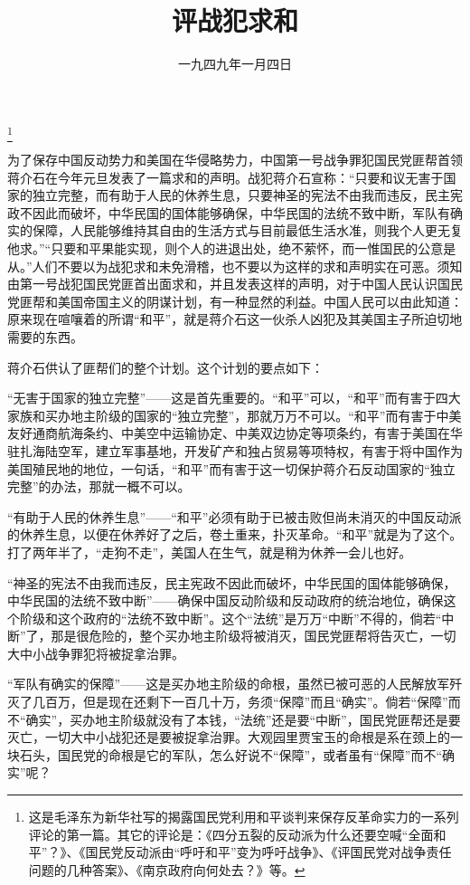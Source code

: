 
\title{评战犯求和}
\date{一九四九年一月四日}
\thanks{这是毛泽东为新华社写的揭露国民党利用和平谈判来保存反革命实力的一系列评论的第一篇。其它的评论是：《四分五裂的反动派为什么还要空喊“全面和平”？》、《国民党反动派由“呼吁和平”变为呼吁战争》、《评国民党对战争责任问题的几种答案》、《南京政府向何处去？》等。}
\maketitle


为了保存中国反动势力和美国在华侵略势力，中国第一号战争罪犯国民党匪帮首领蒋介石在今年元旦发表了一篇求和的声明。战犯蒋介石宣称：“只要和议无害于国家的独立完整，而有助于人民的休养生息，只要神圣的宪法不由我而违反，民主宪政不因此而破坏，中华民国的国体能够确保，中华民国的法统不致中断，军队有确实的保障，人民能够维持其自由的生活方式与目前最低生活水准，则我个人更无复他求。”“只要和平果能实现，则个人的进退出处，绝不萦怀，而一惟国民的公意是从。”人们不要以为战犯求和未免滑稽，也不要以为这样的求和声明实在可恶。须知由第一号战犯国民党匪首出面求和，并且发表这样的声明，对于中国人民认识国民党匪帮和美国帝国主义的阴谋计划，有一种显然的利益。中国人民可以由此知道：原来现在喧嚷着的所谓“和平”，就是蒋介石这一伙杀人凶犯及其美国主子所迫切地需要的东西。

蒋介石供认了匪帮们的整个计划。这个计划的要点如下：

“无害于国家的独立完整”——这是首先重要的。“和平”可以，“和平”而有害于四大家族和买办地主阶级的国家的“独立完整”，那就万万不可以。“和平”而有害于中美友好通商航海条约、中美空中运输协定、中美双边协定等项条约，有害于美国在华驻扎海陆空军，建立军事基地，开发矿产和独占贸易等项特权，有害于将中国作为美国殖民地的地位，一句话，“和平”而有害于这一切保护蒋介石反动国家的“独立完整”的办法，那就一概不可以。

“有助于人民的休养生息”——“和平”必须有助于已被击败但尚未消灭的中国反动派的休养生息，以便在休养好了之后，卷土重来，扑灭革命。“和平”就是为了这个。打了两年半了，“走狗不走”，美国人在生气，就是稍为休养一会儿也好。

“神圣的宪法不由我而违反，民主宪政不因此而破坏，中华民国的国体能够确保，中华民国的法统不致中断”——确保中国反动阶级和反动政府的统治地位，确保这个阶级和这个政府的“法统不致中断”。这个“法统”是万万“中断”不得的，倘若“中断”了，那是很危险的，整个买办地主阶级将被消灭，国民党匪帮将告灭亡，一切大中小战争罪犯将被捉拿治罪。

“军队有确实的保障”——这是买办地主阶级的命根，虽然已被可恶的人民解放军歼灭了几百万，但是现在还剩下一百几十万，务须“保障”而且“确实”。倘若“保障”而不“确实”，买办地主阶级就没有了本钱，“法统”还是要“中断”，国民党匪帮还是要灭亡，一切大中小战犯还是要被捉拿治罪。大观园里贾宝玉的命根是系在颈上的一块石头，国民党的命根是它的军队，怎么好说不“保障”，或者虽有“保障”而不“确实”呢？

